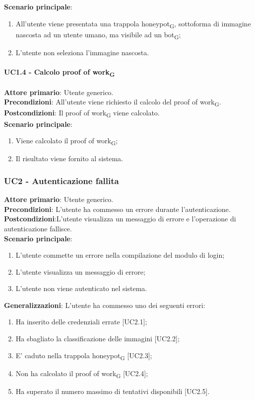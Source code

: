 \textbf{Scenario principale}:
\begin{enumerate}
   \item All'utente viene presentata una trappola honeypot\textsubscript{G}, sottoforma di immagine nascosta ad un utente umano, ma visibile ad un bot\textsubscript{G};
   \item L'utente non seleziona l'immagine nascosta.
\end{enumerate}

\paragraph{UC1.4 - Calcolo proof of work\textsubscript{G}}
\textbf{Attore primario}: Utente generico.\\
\textbf{Precondizioni}: All'utente viene richiesto il calcolo del proof of work\textsubscript{G}.\\
\textbf{Postcondizioni}: Il proof of work\textsubscript{G} viene calcolato.\\

\textbf{Scenario principale}:
\begin{enumerate}
   \item Viene calcolato il proof of work\textsubscript{G};
   \item Il risultato viene fornito al sistema.
\end{enumerate}

\subsubsection{UC2 - Autenticazione fallita}
\textbf{Attore primario}: Utente generico.\\
\textbf{Precondizioni}: L’utente ha commesso un errore durante l'autenticazione.\\
\textbf{Postcondizioni}:L’utente visualizza un messaggio di errore e l’operazione di autenticazione fallisce.\\

\textbf{Scenario principale}:
\begin{enumerate}
   \item L’utente commette un errore nella compilazione del modulo di login;
   \item L'utente visualizza un messaggio di errore;
   \item L'utente non viene autenticato nel sistema.
\end{enumerate}

\textbf{Generalizzazioni}: L'utente ha commesso uno dei seguenti errori:
\begin{enumerate}
	\item Ha inserito delle credenziali errate [UC2.1];
	\item Ha sbagliato la classificazione delle immagini [UC2.2];
	\item E' caduto nella trappola honeypot\textsubscript{G} [UC2.3];
	\item Non ha calcolato il proof of work\textsubscript{G} [UC2.4];
	\item Ha superato il numero massimo di tentativi disponibili [UC2.5].
\end{enumerate}

